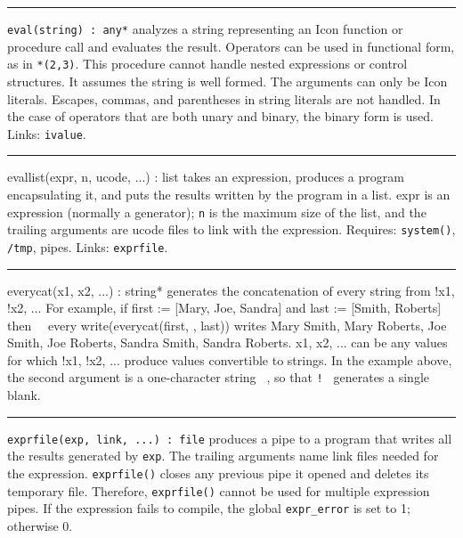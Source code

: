 \vspace{0.25cm}\hrule{}

\texttt{eval(string) : any*} analyzes a string
representing an Icon function or procedure call and evaluates the
result. Operators can be used in functional form, as in
\texttt{{\textquotedbl}*(2,3){\textquotedbl}}. This procedure cannot
handle nested expressions or control structures. It assumes the string
is well formed. The arguments can only be Icon literals. Escapes,
commas, and parentheses in string literals are not handled. In the case
of operators that are both unary and binary, the binary form is used.
Links: \texttt{ivalue}. 

\vspace{0.25cm}\hrule{}

\textsf{evallist(expr, n, ucode, ...) : list} takes an expression,
produces a program encapsulating it, and puts the results written by
the program in a list. \textsf{expr} is an expression (normally a
generator); \texttt{n} is the maximum size of the list, and the
trailing arguments are ucode files to link with the expression.
Requires: \texttt{system()}, \texttt{/tmp}, pipes. Links:
\texttt{exprfile}. 

\vspace{0.25cm}\hrule{}

\textsf{everycat(x1, x2, ...) : string*} generates the concatenation of
every string from !x1, !x2, ... For example, if first :=
[{\textquotedbl}Mary{\textquotedbl}, {\textquotedbl}Joe{\textquotedbl},
{\textquotedbl}Sandra{\textquotedbl}] and last :=
[{\textquotedbl}Smith{\textquotedbl},
{\textquotedbl}Roberts{\textquotedbl}] then \ \ every
write(everycat(first, {\textquotedbl} {\textquotedbl}, last)) writes
Mary Smith, Mary Roberts, Joe Smith, Joe Roberts, Sandra Smith, Sandra
Roberts. x1, x2, ... can be any values for which !x1, !x2, ... produce
values convertible to strings. In the example above, the second
argument is a one-character string \texttt{{\textquotedbl}
{\textquotedbl}}, so that \texttt{!{\textquotedbl} {\textquotedbl}}
generates a single blank. 

\vspace{0.25cm}\hrule{}

\texttt{exprfile(exp, link, ...) : file} produces a pipe to a program
that writes all the results generated by \texttt{exp}. The trailing
arguments name link files needed for the expression.
\texttt{exprfile()} closes any previous pipe it opened and deletes its
temporary file. Therefore, \texttt{exprfile()} cannot be used for
multiple expression pipes. If the expression fails to compile, the
global \texttt{expr\_error} is set to 1; otherwise 0. 

